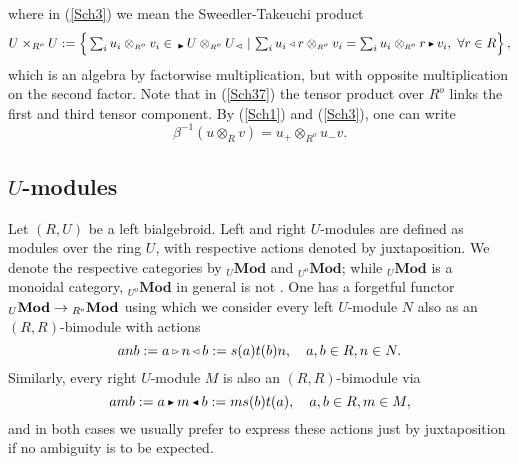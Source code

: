 \documentclass[reqno, a4paper, 10pt]{amsart}
\numberwithin{equation}{section}
\theoremstyle{plain}
\theoremstyle{definition}
\theoremstyle{remark}
\begin{document}
where in (\ref{Sch3}) we mean the Sweedler-Takeuchi product
\begin{equation*}
\label{petrarca}
		  U \times_{{R^{o}}} U:=
		  \left\{\underset{}{} \textstyle\sum_i u_i \otimes_{{\scriptscriptstyle{{R^{o}}}}}  v_i \in 
		  {}_{{\,\raise1pt\hbox{$\scriptscriptstyle{\blacktriangleright}$} \, }} U \otimes_{{\scriptscriptstyle{{R^{o}}}}}  U_{{\,\raise1pt\hbox{$\scriptscriptstyle{\lhd}$} \, }}\,|\,
		  \sum_i u_i {{\,\raise1pt\hbox{$\scriptscriptstyle{\lhd}$} \, }} r \otimes_{{\scriptscriptstyle{{R^{o}}}}}  v_i=
		  \sum_i u_i \otimes_{{\scriptscriptstyle{{R^{o}}}}}  r {{\,\raise1pt\hbox{$\scriptscriptstyle{\blacktriangleright}$} \, }}
		  v_i, \,\, \forall r \in R
		  \right \},
\end{equation*}
which is an algebra by factorwise
multiplication, but with opposite 
multiplication on the second factor.
Note that in (\ref{Sch37}) the tensor product
over $R^{o}$ links the first and
third tensor component. 
By (\ref{Sch1}) and (\ref{Sch3}), one can write
$$
\beta^{-1}(u \otimes_{{\scriptscriptstyle{R}}} v) = u_+ \otimes_{{\scriptscriptstyle{{R^{o}}}}}  u_-v.
$$

\subsection{$U$-modules}
Let $(R, U)$ be a left bialgebroid. 
Left and right $U$-modules are defined as modules over the ring $U$, with respective actions denoted by juxtaposition. 
We denote the respective categories by
${}_U{\mathbf{Mod}}$ and ${}_{U^{{{o}}}}{\mathbf{Mod}}$; while ${}_U{\mathbf{Mod}}$ is
a monoidal category, ${}_{U^{{{o}}}}{\mathbf{Mod}}$ in general is
not \cite{Schau:BONCRAASTFHB}. One has a forgetful functor  
${}_{U}{\mathbf{Mod}} \rightarrow {}_{{R^{\rm e}}}{\mathbf{Mod}}$ using which
we consider every left 
$U$-module $N$ also as an $(R,R)$-bimodule
with actions 
\begin{equation}\label{brot}
	anb := 	  a {{\,\raise1pt\hbox{$\scriptscriptstyle{\rhd}$} \, }} n {{\,\raise1pt\hbox{$\scriptscriptstyle{\lhd}$} \, }} b := {s}(a){t}(b)n,\quad
		  a,b \in R,n \in N.
\end{equation} 
Similarly, every right $U$-module $M$ is also 
an $(R,R)$-bimodule via
\begin{equation}
\label{salz}
	amb:= 	  a {{\,\raise1pt\hbox{$\scriptscriptstyle{\blacktriangleright}$} \, }} m {{\,\raise1pt\hbox{$\scriptscriptstyle{\blacktriangleleft}$} \, }} b := 
			m {s}(b) {t}(a),\quad
		  a,b \in R,m \in M,
\end{equation} 
and in both cases we usually prefer to express these actions just by juxtaposition if no ambiguity is to be expected.
\end{document}
